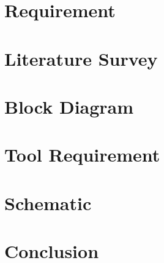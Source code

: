 \documentclass[12pt,a4paper]{report}
\begin{document}
\chapter{Requirement}

\chapter{Literature Survey}

\chapter{Block Diagram}

\chapter{Tool Requirement}

\newpage
\chapter{Schematic}

\newpage
\chapter{Conclusion}


 

\end{document}
